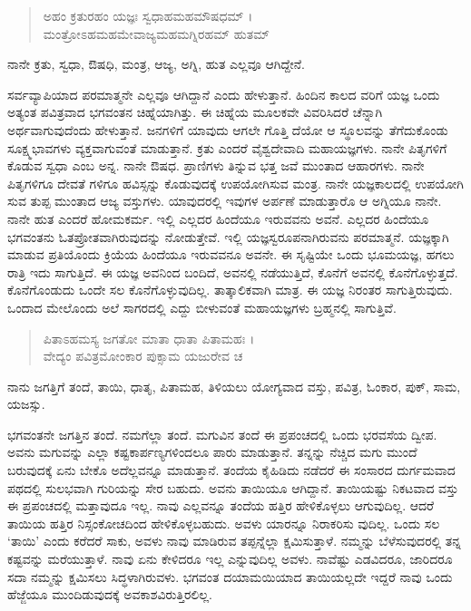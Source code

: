 \begin{verse}
ಅಹಂ ಕ್ರತುರಹಂ ಯಜ್ಞಃ ಸ್ವಧಾಹಮಹಮೌಷಧಮ್ ।\\ಮಂತ್ರೋಽಹಮಹಮೇವಾಜ್ಯಮಹಮಗ್ನಿರಹಮ್ ಹುತಮ್ 
\end{verse}

{\small ನಾನೇ ಕ್ರತು, ಸ್ವಧಾ, ಔಷಧಿ, ಮಂತ್ರ, ಆಜ್ಯ, ಅಗ್ನಿ, ಹುತ ಎಲ್ಲವೂ ಆಗಿದ್ದೇನೆ.}

ಸರ್ವವ್ಯಾಪಿಯಾದ ಪರಮಾತ್ಮನೇ ಎಲ್ಲವೂ ಆಗಿದ್ದಾನೆ ಎಂದು ಹೇಳುತ್ತಾನೆ. ಹಿಂದಿನ ಕಾಲದ ವರಿಗೆ ಯಜ್ಞ ಒಂದು ಅತ್ಯಂತ ಪವಿತ್ರವಾದ ಭಗವಂತನ ಚಿಹ್ನೆಯಾಗಿತ್ತು. ಈ ಚಿಹ್ನೆಯ ಮೂಲಕವೇ ವಿವರಿಸಿದರೆ ಚೆನ್ನಾಗಿ ಅರ್ಥವಾಗುವುದೆಂದು ಹೇಳುತ್ತಾನೆ. ಜನಗಳಿಗೆ ಯಾವುದು ಆಗಲೇ ಗೊತ್ತಿ ದೆಯೋ ಆ ಸ್ಥೂಲವನ್ನು ತೆಗೆದುಕೊಂಡು ಸೂಕ್ಷ್ಮಭಾವಗಳು ವ್ಯಕ್ತವಾಗುವಂತೆ ಮಾಡುತ್ತಾನೆ. ಕ್ರತು ಎಂದರೆ ವೈಶ್ವದೇವಾದಿ ಮಹಾಯಜ್ಞಗಳು. ನಾನೇ ಪಿತೃಗಳಿಗೆ ಕೊಡುವ ಸ್ವಧಾ ಎಂಬ ಅನ್ನ. ನಾನೇ ಔಷಧ. ಪ್ರಾಣಿಗಳು ತಿನ್ನುವ ಭತ್ತ ಜವೆ ಮುಂತಾದ ಆಹಾರಗಳು. ನಾನೇ ಪಿತೃಗಳಿಗೂ ದೇವತೆ ಗಳಿಗೂ ಹವಿಸ್ಸನ್ನು ಕೊಡುವುದಕ್ಕೆ ಉಪಯೋಗಿಸುವ ಮಂತ್ರ. ನಾನೇ ಯಜ್ಞಕಾಲದಲ್ಲಿ ಉಪಯೋಗಿ ಸುವ ತುಪ್ಪ ಮುಂತಾದ ಆಜ್ಯ ವಸ್ತುಗಳು. ಯಾವುದರಲ್ಲಿ ಇವುಗಳ ಅರ್ಪಣೆ ಮಾಡುತ್ತಾರೊ ಆ ಅಗ್ನಿಯೂ ನಾನೇ. ನಾನೇ ಹುತ ಎಂದರೆ ಹೋಮಕರ್ಮ. ಇಲ್ಲಿ ಎಲ್ಲದರ ಹಿಂದೆಯೂ ಇರುವವನು ಅವನೆ. ಎಲ್ಲದರ ಹಿಂದೆಯೂ ಭಗವಂತನು ಓತಪ್ರೋತವಾಗಿರುವುದನ್ನು ನೋಡುತ್ತೇವೆ. ಇಲ್ಲಿ ಯಜ್ಞಸ್ವರೂಪನಾಗಿರುವನು ಪರಮಾತ್ಮನೆ. ಯಜ್ಞಕ್ಕಾಗಿ ಮಾಡುವ ಪ್ರತಿಯೊಂದು ಕ್ರಿಯೆಯ ಹಿಂದೆಯೂ ಇರುವವನೂ ಅವನೇ. ಈ ಸೃಷ್ಟಿಯೇ ಒಂದು ಭೂಮಯಜ್ಞ, ಹಗಲು ರಾತ್ರಿ ಇದು ಸಾಗುತ್ತಿದೆ. ಈ ಯಜ್ಞ ಅವನಿಂದ ಬಂದಿದೆ, ಅವನಲ್ಲಿ ನಡೆಯುತ್ತಿದೆ, ಕೊನೆಗೆ ಅವನಲ್ಲಿ ಕೊನೆಗೊಳ್ಳುತ್ತದೆ. ಕೊನೆಗೊಂಡುದು ಒಂದೇ ಸಲ ಕೊನೆಗೊಳ್ಳುವುದಿಲ್ಲ. ತಾತ್ಕಾಲಿಕವಾಗಿ ಮಾತ್ರ. ಈ ಯಜ್ಞ ನಿರಂತರ ಸಾಗುತ್ತಿರುವುದು. ಒಂದಾದ ಮೇಲೊಂದು ಅಲೆ ಸಾಗರದಲ್ಲಿ ಎದ್ದು ಬೀಳುವಂತೆ ಮಹಾಯಜ್ಞಗಳು ಬ್ರಹ್ಮನಲ್ಲಿ ಸಾಗುತ್ತಿವೆ.

\begin{verse}
ಪಿತಾಽಹಮಸ್ಯ ಜಗತೋ ಮಾತಾ ಧಾತಾ ಪಿತಾಮಹಃ ।\\ವೇದ್ಯಂ ಪವಿತ್ರಮೋಂಕಾರ ಪುಕ್ಸಾಮ ಯಜುರೇವ ಚ 
\end{verse}

{\small ನಾನು ಜಗತ್ತಿಗೆ ತಂದೆ, ತಾಯಿ, ಧಾತೃ, ಪಿತಾಮಹ, ತಿಳಿಯಲು ಯೋಗ್ಯವಾದ ವಸ್ತು, ಪವಿತ್ರ, ಓಂಕಾರ, ಪುಕ್, ಸಾಮ, ಯಜಸ್ಸು.}

ಭಗವಂತನೇ ಜಗತ್ತಿನ ತಂದೆ. ನಮಗೆಲ್ಲಾ ತಂದೆ. ಮಗುವಿನ ತಂದೆ ಈ ಪ್ರಪಂಚದಲ್ಲಿ ಒಂದು ಭರವಸೆಯ ದ್ವೀಪ. ಅವನು ಮಗುವನ್ನು ಎಲ್ಲಾ ಕಷ್ಟಕಾರ್ಪಣ್ಯಗಳಿಂದಲೂ ಪಾರು ಮಾಡುತ್ತಾನೆ. ತನ್ನನ್ನು ನೆಚ್ಚಿದ ಮಗು ಮುಂದೆ ಬರುವುದಕ್ಕೆ ಏನು ಬೇಕೊ ಅದೆಲ್ಲವನ್ನೂ ಮಾಡುತ್ತಾನೆ. ತಂದೆಯ ಕೈಹಿಡಿದು ನಡೆದರೆ ಈ ಸಂಸಾರದ ದುರ್ಗಮವಾದ ಪಥದಲ್ಲಿ ಸುಲಭವಾಗಿ ಗುರಿಯನ್ನು ಸೇರ ಬಹುದು. ಅವನು ತಾಯಿಯೂ ಆಗಿದ್ದಾನೆ. ತಾಯಿಯಷ್ಟು ನಿಕಟವಾದ ವಸ್ತು ಈ ಪ್ರಪಂಚದಲ್ಲಿ ಮತ್ತಾವುದೂ ಇಲ್ಲ. ನಾವು ಎಲ್ಲವನ್ನೂ ತಂದೆಯ ಹತ್ತಿರ ಹೇಳಿಕೊಳ್ಳಲು ಆಗುವುದಿಲ್ಲ. ಆದರೆ ತಾಯಿಯ ಹತ್ತಿರ ನಿಸ್ಸಂಕೋಚದಿಂದ ಹೇಳಿಕೊಳ್ಳಬಹುದು. ಅವಳು ಯಾರನ್ನೂ ನಿರಾಕರಿಸು ವುದಿಲ್ಲ. ಒಂದು ಸಲ ‘ತಾಯಿ’ ಎಂದು ಕರೆದರೆ ಸಾಕು, ಅವಳು ನಾವು ಮಾಡಿರುವ ತಪ್ಪನ್ನೆಲ್ಲಾ ಕ್ಷಮಿಸುತ್ತಾಳೆ. ನಮ್ಮನ್ನು ಬೆಳೆಸುವುದರಲ್ಲಿ ತನ್ನ ಕಷ್ಟವನ್ನು ಮರೆಯುತ್ತಾಳೆ. ನಾವು ಏನು ಕೇಳಿದರೂ ಇಲ್ಲ ಎನ್ನುವುದಿಲ್ಲ ಅವಳು. ನಾವೆಷ್ಟು ಎಡವಿದರೂ, ಜಾರಿದರೂ ಸದಾ ನಮ್ಮನ್ನು ಕ್ಷಮಿಸಲು ಸಿದ್ಧಳಾಗಿರುವಳು. ಭಗವಂತ ದಯಾಮಯಿಯಾದ ತಾಯಿಯಲ್ಲದೇ ಇದ್ದರೆ ನಾವು ಒಂದು ಹೆಜ್ಜೆಯೂ ಮುಂದಿಡುವುದಕ್ಕೆ ಅವಕಾಶವಿರುತ್ತಿರಲಿಲ್ಲ.

